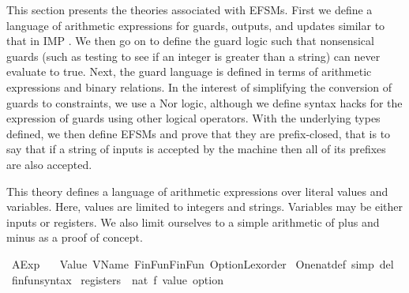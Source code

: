 %
\begin{isabellebody}%
%
%
\isadelimdocument
%
\endisadelimdocument
%
\isatagdocument
%
\isamarkuptrue%
%
\endisatagdocument
{\isafolddocument}%
%
\isadelimdocument
%
\endisadelimdocument
%
\begin{isamarkuptext}%
This section presents the theories associated with EFSMs. First we define a language of arithmetic
expressions for guards, outputs, and updates similar to that in IMP \cite{fixme}. We then go on to
define the guard logic such that nonsensical guards (such as testing to see if an integer is greater
than a string) can never evaluate to true. Next, the guard language is defined in terms of
arithmetic expressions and binary relations. In the interest of simplifying the conversion of guards
to constraints, we use a Nor logic, although we define syntax hacks for the expression of guards
using other logical operators. With the underlying types defined, we then define EFSMs and prove
that they are prefix-closed, that is to say that if a string of inputs is accepted by the machine
then all of its prefixes are also accepted.%
\end{isamarkuptext}\isamarkuptrue%
%
\isadelimdocument
%
\endisadelimdocument
%
\isatagdocument
%
\isamarkuptrue%
%
\endisatagdocument
{\isafolddocument}%
%
\isadelimdocument
%
\endisadelimdocument
%
\begin{isamarkuptext}%
This theory defines a language of arithmetic expressions over literal values and variables. Here,
values are limited to integers and strings. Variables may be either inputs or registers. We also
limit ourselves to a simple arithmetic of plus and minus as a proof of concept.%
\end{isamarkuptext}\isamarkuptrue%
%
\isadelimtheory
%
\endisadelimtheory
%
\isatagtheory
{}\isamarkupfalse%
\ AExp\isanewline
\ \ \ Value\ VName\ FinFun{\isachardot}FinFun\ Option{\isacharunderscore}Lexorder\isanewline
{}%
\endisatagtheory
{\isafoldtheory}%
%
\isadelimtheory
%
\endisadelimtheory
\isanewline
\isanewline
{}\isamarkupfalse%
\ One{\isacharunderscore}nat{\isacharunderscore}def\ {\isacharbrackleft}simp\ del{\isacharbrackright}\isanewline
{}\isamarkupfalse%
\ finfun{\isacharunderscore}syntax\isanewline
\isanewline
{}\isamarkupfalse%
\ registers\ {\isacharequal}\ {\isachardoublequoteopen}nat\ {\isasymRightarrow}f\ value\ option{\isachardoublequoteclose}\isanewline

\end{isabellebody}
